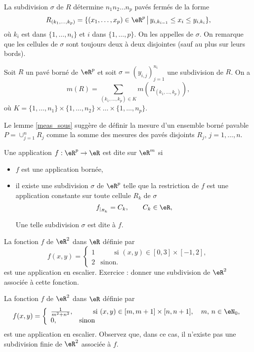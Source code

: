 La subdivision $\sigma$ de $R$ détermine $n_1n_2\ldots n_p$ pavés fermés de la forme 
\[
R_{(k_1,\ldots,k_p)}=\{(x_1,\ldots, x_p)\in\eR^p\,\big\vert\, y_{i,k_{i-1}}\leq x_i\leq y_{i,k_i}\},
\]
où $k_i$ est dans $\{1,\ldots, n_i\}$ et $i$ dans $\{1,\ldots, p\}$. On les appelles  de $\sigma$. On remarque que les cellules de $\sigma$ sont toujours deux à deux disjointes (sauf au plus sur leurs bords). 
\begin{lemma}\label{meas_sous}
	Soit $R$ un pavé borné de $\eR^p$ et soit $\sigma=(y_{i,j})_{j=1}^{n_i}$ une subdivision de $R$. 
On a 
\[
m(R)=\sum_{(k_1,\ldots,k_p)\in K} m(R_{(k_1,\ldots,k_p)}),
\] 
où $K=\{1,\ldots,n_1\}\times\{1,\ldots,n_2\}\times\ldots \times\{1,\ldots,n_p\}$.
\end{lemma}
Le lemme \ref{meas_sous} suggère de définir la mesure d'un ensemble borné pavable $P=\cup_{j=1}^{n}R_j$ comme la somme des mesures des pavés disjoints $R_j$, $j=1,\ldots, n$.
\begin{definition}
Une application $f:\eR^p\to\eR$ est dite  sur $\eR^m$ si
  \begin{itemize}
  \item $f$ est une application bornée,
\item il existe une subdivision $\sigma$ de $\eR^p$ telle que la restriction de $f$  est une application constante sur toute cellule $R_k$ de $\sigma$
\[
f_{\vert_{R_k}}=C_k, \qquad C_k\in\eR,
\]
 
Une telle subdivision $\sigma$ est dite  à $f$. 
  \end{itemize}
\end{definition} 
\begin{example}
  La fonction $f$ de $\eR^2$ dans  $\eR$ définie par 
  \begin{equation}
    f(x,y)=\left\{
    \begin{array}{ll}
      1&\qquad \textrm{si } (x,y) \in [0,3]\times[-1,2],\\
2 &\textrm{sinon.} 
    \end{array}\right.
  \end{equation}
est une application en escalier. Exercice : donner une subdivision de $\eR^2$ associée à cette fonction.
\end{example}
\begin{example}
  La fonction $f$ de $\eR^2$ dans  $\eR$ définie par 
  \begin{equation}
    f(x,y)=\left\{
    \begin{array}{ll}
      \frac{1}{m^2+n^2},&\qquad \textrm{si } (x,y) \in [m,m+1]\times[n,n+1], \quad m,\,n\in\eN_0,\\
0, &\textrm{sinon} 
    \end{array}\right.
  \end{equation}
est une application en escalier.  Observez que, dans ce cas, il n'existe pas une subdivision finie de $\eR^2$ associée à $f$. 
\end{example}
